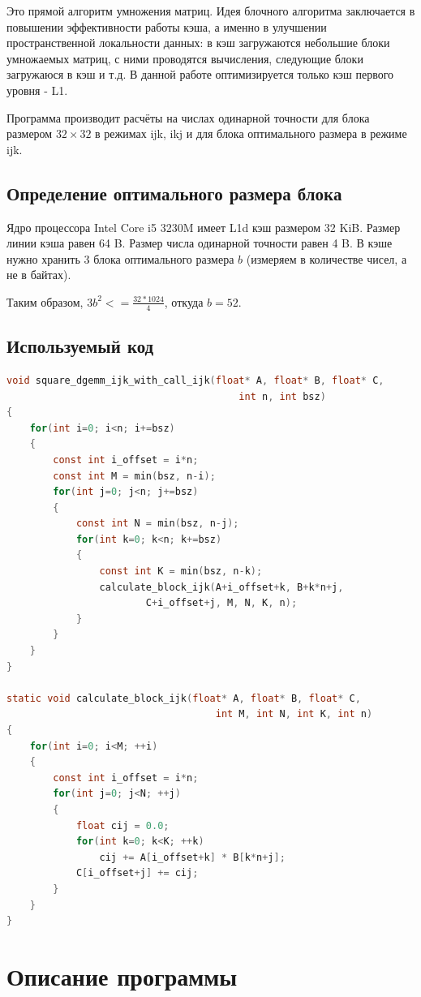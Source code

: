 \documentclass[14pt]{extarticle}
\begin{document}
Это прямой алгоритм умножения матриц. Идея блочного алгоритма заключается в повышении эффективности работы кэша, а именно в улучшении пространственной локальности данных: в кэш загружаются небольшие блоки умножаемых матриц, с ними проводятся вычисления, следующие блоки загружаюся в кэш и т.д.
В данной работе оптимизируется только кэш первого уровня - L1.

Программа производит расчёты на числах одинарной точности для блока размером $32 \times 32$ в режимах ijk, ikj и для блока оптимального размера в режиме ijk.

\subsection*{Определение оптимального размера блока}
Ядро процессора Intel Core i5 3230M имеет L1d кэш размером 32 KiB.
Размер линии кэша равен 64 B.
Размер числа одинарной точности равен 4 B.
В кэше нужно хранить 3 блока оптимального размера $b$ (измеряем в количестве чисел, а не в байтах).

Таким образом, $ 3b^2 <= \frac{32*1024}{4} $, откуда $b = 52$.

\subsection*{Используемый код}
\begin{lstlisting}[language=C]
void square_dgemm_ijk_with_call_ijk(float* A, float* B, float* C,
                                        int n, int bsz)
{
    for(int i=0; i<n; i+=bsz)
    {
        const int i_offset = i*n;
        const int M = min(bsz, n-i);
        for(int j=0; j<n; j+=bsz)
        {
            const int N = min(bsz, n-j);
            for(int k=0; k<n; k+=bsz)
            {
                const int K = min(bsz, n-k);
                calculate_block_ijk(A+i_offset+k, B+k*n+j,
                		C+i_offset+j, M, N, K, n);
            }
        }
    }
}

static void calculate_block_ijk(float* A, float* B, float* C,
                                    int M, int N, int K, int n)
{
    for(int i=0; i<M; ++i)
    {
        const int i_offset = i*n;
        for(int j=0; j<N; ++j)
        {
            float cij = 0.0;
            for(int k=0; k<K; ++k)
                cij += A[i_offset+k] * B[k*n+j];
            C[i_offset+j] += cij;
        }
    }
}
\end{lstlisting}

\section*{Описание программы}
\end{document}
